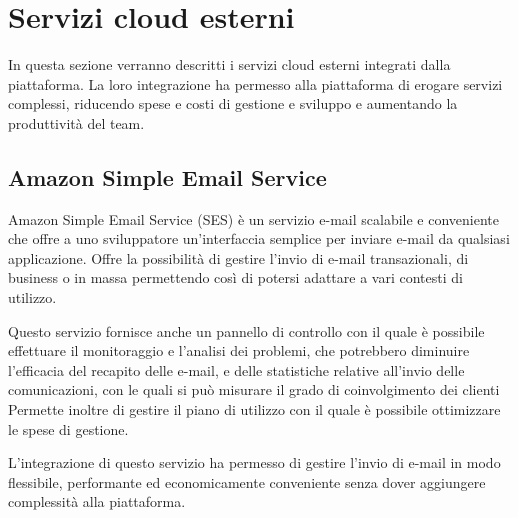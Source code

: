 \section{Servizi cloud esterni}
In questa sezione verranno descritti i servizi cloud esterni integrati dalla piattaforma.
La loro integrazione ha permesso alla piattaforma di erogare servizi complessi, riducendo spese e costi
di gestione e sviluppo e aumentando la produttività del team.

\subsection{Amazon Simple Email Service}
Amazon Simple Email Service \cite{AWS-SES} (SES) è un servizio e-mail scalabile e conveniente che
offre a uno sviluppatore un'interfaccia semplice per inviare e-mail da qualsiasi applicazione.
Offre la possibilità di gestire l'invio di e-mail transazionali, di business o in massa permettendo così
di potersi adattare a vari contesti di utilizzo.

Questo servizio fornisce anche un pannello di controllo con il quale è possibile effettuare il monitoraggio e l'analisi dei
problemi, che potrebbero diminuire l'efficacia del recapito delle e-mail, e delle statistiche
relative all'invio delle comunicazioni, con le quali si può misurare il grado di coinvolgimento dei clienti
Permette inoltre di gestire il piano di utilizzo con il quale è possibile ottimizzare le spese di gestione.

L'integrazione di questo servizio ha permesso di gestire l'invio di e-mail in modo flessibile, performante ed economicamente
conveniente senza dover aggiungere complessità alla piattaforma.